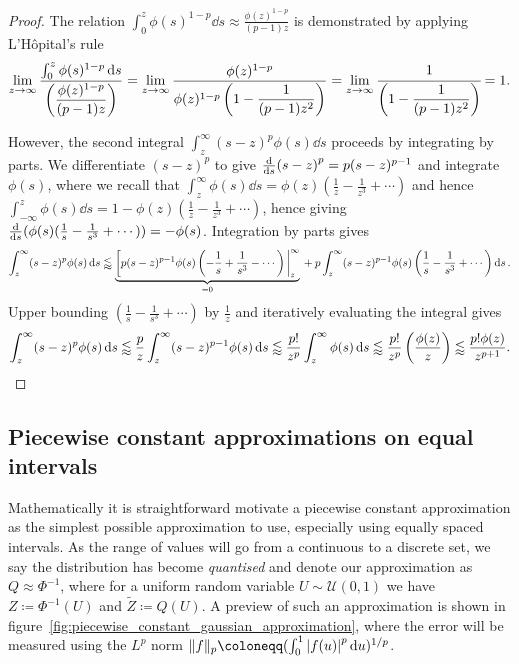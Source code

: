 \documentclass[manuscript,review]{acmart}
\begin{document}
\begin{proof}
The relation  $ \int_{0}^{z} \phi(s)^{1-p} \dd{s} \approx \tfrac{\phi(z)^{1-p}}{(p-1)z}  $ is demonstrated by applying L'H\^{o}pital's rule
\begin{equation*}
\lim_{z \to \infty} \dfrac{\int_{0}^{z} \phi(s)^{1-p} \dd{s}}{\left(\dfrac{\phi(z)^{1-p}}{(p-1)z}\right)} 
=  \lim_{z \to \infty} \dfrac{\phi(z)^{1-p}}{\phi(z)^{1-p}\left(1 - \dfrac{1}{(p-1)z^2} \right)} 
= \lim_{z \to \infty} \cfrac{1}{\left(1 - \dfrac{1}{(p-1)z^2}\right)} 
= 1.
\end{equation*}

However, the second integral $ \int_{z}^{\infty} (s-z)^p\phi(s) \dd{s} $ proceeds by integrating by parts. We differentiate $ (s-z)^p $ to give $ \dv{s} (s-z)^p = p (s-z)^{p-1} $ and integrate $ \phi(s) $, where we recall that $ \int_{z}^{\infty} \phi(s) \dd{s}  = \phi(z)(\tfrac{1}{z} - \tfrac{1}{z^3} + \cdots) $ and hence $ \int_{-\infty}^{z} \phi(s) \dd{s}  = 1 -\phi(z)(\tfrac{1}{z} - \tfrac{1}{z^3} + \cdots) $, hence giving $ {\dv{s}} (\phi(s)(\tfrac{1}{s} - \tfrac{1}{s^3} + \cdots))  = -\phi(s) $. Integration by parts gives
\begin{equation*}
\int_{z}^{\infty} (s-z)^p\phi(s) \dd{s} \lessapprox \underbrace{\eval[p(s-z)^{p-1}\phi(s)\left(-\dfrac{1}{s} + \dfrac{1}{s^3} - \cdots\right)|_{z}^{\infty}}_{{} = 0} {} + p \int_{z}^{\infty} (s-z)^{p-1} \phi(s) \left(\dfrac{1}{s} - \dfrac{1}{s^3} + \cdots\right) \dd{s}.
\end{equation*}
Upper bounding $ (\tfrac{1}{s} - \tfrac{1}{s^3} + \cdots )$ by $ \tfrac{1}{z} $ and iteratively evaluating the integral gives
\begin{equation*}
\int_{z}^{\infty} (s-z)^p\phi(s) \dd{s}
\lessapprox \dfrac{p}{z} \int_{z}^{\infty} (s-z)^{p-1} \phi(s) \dd{s} 
\lessapprox \dfrac{p!}{z^p} \int_{z}^{\infty} \phi(s) \dd{s} 
\lessapprox \dfrac{p!}{z^p} \left(\dfrac{\phi(z)}{z}\right) 
\lessapprox \frac{p!\phi(z)}{z^{p+1}}. \qedhere
\end{equation*}
\end{proof}

\subsection{Piecewise constant approximations on equal intervals}
\label{sec:piecewise_constant_approximations_on_equal_intervals}

Mathematically it is straightforward motivate a piecewise constant approximation as the simplest possible approximation to use, especially using equally spaced intervals. As the range of values will go from a continuous to a discrete set, we say the distribution has become \emph{quantised} and denote our approximation as $ Q \approx \Phi^{-1} $, where for a uniform random variable $ U \sim \mathcal{U}(0, 1)$ we have $ Z \coloneqq \Phi^{-1}(U) $ and $ \tilde{Z} \coloneqq Q(U) $. A preview of such an approximation is shown in figure~\ref{fig:piecewise_constant_gaussian_approximation}, where the error will be measured using the $ L^p $ norm $ \lVert f \rVert_p \coloneqq (\int_0^1 \abs{f(u)}^p \dd{u})^{1/p} $.
\end{document}
